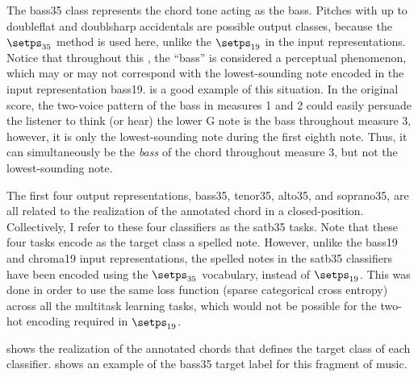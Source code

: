 
The \gls{bass35} class represents the chord tone acting as
the bass. Pitches with up to \gls{doubleflat} and
\gls{doublsharp} accidentals are possible output classes,
because the $\setps_{35}$ method is used here, unlike the
$\setps_{19}$ in the input representations. Notice that
throughout this \thesisdiss{}, the ``bass'' is considered a
perceptual phenomenon, which may or may not correspond with
the lowest-sounding note encoded in the input representation
\gls{bass19}.  is a good example of
this situation. In the original score, the two-voice pattern
of the bass in measures 1 and 2 could easily persuade the
listener to think (or hear) the lower G note is the bass
throughout measure 3, however, it is only the
lowest-sounding note during the first eighth note. Thus, it
can simultaneously be the \emph{bass} of the chord
throughout measure 3, but not the lowest-sounding note.

The first four output representations, \gls{bass35},
\gls{tenor35}, \gls{alto35}, and \gls{soprano35}, are all
related to the realization of the annotated chord in a
\gls{closed-position}. Collectively, I refer to these four
classifiers as the \gls{satb35} tasks. Note that these four
tasks encode as the target class a spelled note. However,
unlike the \gls{bass19} and \gls{chroma19} input
representations, the spelled notes in the \gls{satb35}
classifiers have been encoded using the $\setps_{35}$
vocabulary, instead of $\setps_{19}$. This was done in order
to use the same loss function (sparse categorical cross
entropy) across all the multitask learning tasks, which
would not be possible for the two-hot encoding required in
$\setps_{19}$.

 shows the realization of the annotated
chords that defines the target class of each classifier.
 shows an example of the \gls{bass35}
target label for this fragment of music.




